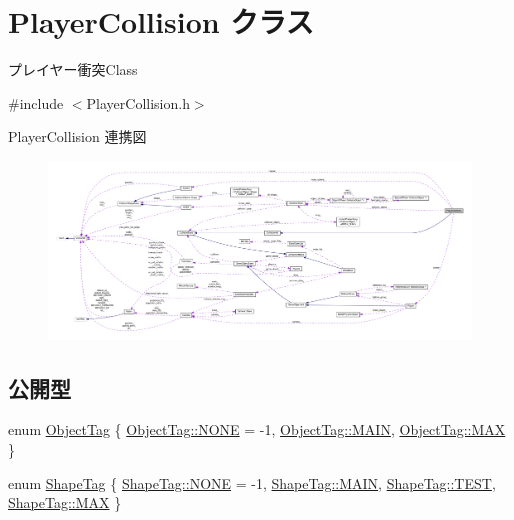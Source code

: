 \hypertarget{class_player_collision}{}\section{Player\+Collision クラス}
\label{class_player_collision}


プレイヤー衝突\+Class  




{\ttfamily \#include $<$Player\+Collision.\+h$>$}



Player\+Collision 連携図\nopagebreak
\begin{figure}[H]
\begin{center}
\leavevmode
\includegraphics[width=350pt]{class_player_collision__coll__graph}
\end{center}
\end{figure}
\subsection*{公開型}
\begin{DoxyCompactItemize}
\item 
enum \mbox{\hyperlink{class_player_collision_a628e8898ff4fc1f85eb4ba44eb0a6907}{Object\+Tag}} \{ \mbox{\hyperlink{class_player_collision_a628e8898ff4fc1f85eb4ba44eb0a6907ab50339a10e1de285ac99d4c3990b8693}{Object\+Tag\+::\+N\+O\+NE}} = -\/1, 
\mbox{\hyperlink{class_player_collision_a628e8898ff4fc1f85eb4ba44eb0a6907a186495f7da296bf880df3a22a492b378}{Object\+Tag\+::\+M\+A\+IN}}, 
\mbox{\hyperlink{class_player_collision_a628e8898ff4fc1f85eb4ba44eb0a6907a26a4b44a837bf97b972628509912b4a5}{Object\+Tag\+::\+M\+AX}}
 \}
\item 
enum \mbox{\hyperlink{class_player_collision_a00abac5e9ca168ff783444a92581c181}{Shape\+Tag}} \{ \mbox{\hyperlink{class_player_collision_a00abac5e9ca168ff783444a92581c181ab50339a10e1de285ac99d4c3990b8693}{Shape\+Tag\+::\+N\+O\+NE}} = -\/1, 
\mbox{\hyperlink{class_player_collision_a00abac5e9ca168ff783444a92581c181a186495f7da296bf880df3a22a492b378}{Shape\+Tag\+::\+M\+A\+IN}}, 
\mbox{\hyperlink{class_player_collision_a00abac5e9ca168ff783444a92581c181a033bd94b1168d7e4f0d644c3c95e35bf}{Shape\+Tag\+::\+T\+E\+ST}}, 
\mbox{\hyperlink{class_player_collision_a00abac5e9ca168ff783444a92581c181a26a4b44a837bf97b972628509912b4a5}{Shape\+Tag\+::\+M\+AX}}
 \}
\end{DoxyCompactItemize}
